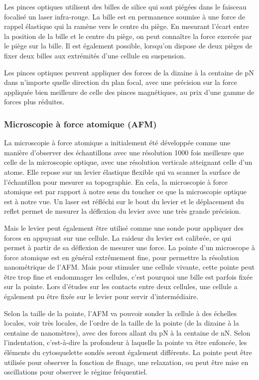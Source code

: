 Les pinces optiques utilisent des billes de silice qui sont piégées dans le faisceau focalisé un laser infra-rouge. 
La bille est en permanence soumise à une force de rappel élastique qui la ramène vers le centre du piège. 
En mesurant l'écart entre la position de la bille et le centre du piège, on peut connaître la force exercée par le piège sur la bille. 
Il est également possible, lorsqu'on dispose de deux pièges de fixer deux billes aux extrémités d'une cellule en suspension. 

Les pinces optiques peuvent appliquer des forces de la dizaine à la centaine de pN dans n'importe quelle direction du plan focal, avec une précision sur la force appliquée bien meilleure de celle des pinces magnétiques, au prix d'une gamme de forces plus réduites. 

\subsubsection{Microscopie à force atomique (AFM)}

La microscopie à force atomique a initialement été développée comme une manière d'observer des échantillons avec une résolution 1000 fois meilleure que celle de la microscopie optique, avec une résolution verticale atteignant celle d'un atome. 
Elle repose sur un levier élastique flexible qui va scanner la surface de l'échantillon pour mesurer sa topographie. En cela, la microscopie à force atomique est par rapport à notre sens du toucher ce que la microscopie optique est à notre vue. Un laser est réfléchi sur le bout du levier et le déplacement du reflet permet de mesurer la déflexion du levier avec une très grande précision. 

Mais le levier peut également être utilisé comme une sonde pour appliquer des forces en appuyant sur une cellule. La raideur du levier est calibrée, ce qui permet à partir de sa déflexion de mesurer une force. 
La pointe d'un microscope à force atomique est en général extrêmement fine, pour permettre la résolution nanométrique de l'AFM. Mais pour stimuler une cellule vivante, cette pointe peut être trop fine et endommager les cellules, c'est pourquoi une bille est parfois fixée sur la pointe. Lors d'études sur les contacts entre deux cellules, une cellule a également pu être fixée sur le levier pour servir d'intermédiaire. 

Selon la taille de la pointe, l'AFM va pouvoir sonder la cellule à des échelles locales, voir très locales, de l'ordre de la taille de la pointe (de la dizaine à la centaine de nanomètres), avec des forces allant du pN à la centaine de nN. Selon l'indentation, c'est-à-dire la profondeur à laquelle la pointe va être enfoncée, les éléments du cytosquelette sondés seront également différents. 
La pointe peut être utilisée pour observer la fonction de fluage, une relaxation, ou peut être mise en oscillations pour observer le régime fréquentiel. 


